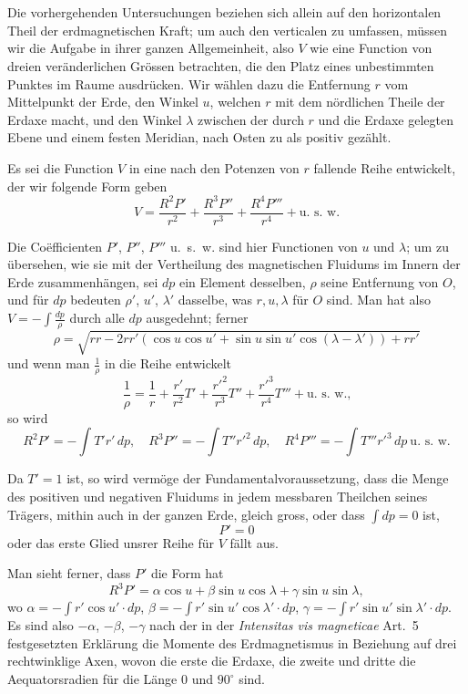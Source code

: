 \documentclass[fontsize=11pt,paper=a4,twoside,openany]{scrbook}
\begin{document}
\section{}

Die vorhergehenden Untersuchungen beziehen sich allein auf den horizontalen Theil der erdmagnetischen Kraft; um auch den verticalen zu umfassen, müssen wir die Aufgabe in ihrer ganzen Allgemeinheit, also $V$ wie eine Function von dreien veränderlichen Grössen betrachten, die den Platz eines unbestimmten Punktes im Raume ausdrücken. Wir wählen dazu die Entfernung $r$ vom Mittelpunkt der Erde, den Winkel $u$, welchen $r$ mit dem nördlichen Theile der Erdaxe macht, und den Winkel $\lambda$ zwischen der durch $r$ und die Erdaxe gelegten Ebene und einem festen Meridian, nach Osten zu als positiv gezählt.

Es sei die Function $V$ in eine nach den Potenzen von $r$ fallende Reihe entwickelt, der wir folgende Form geben
\[
V = \frac{R^2 P'}{r^2} + \frac{R^3 P''}{r^3} + \frac{R^4 P'''}{r^4} + \text{u.~s.~w.}
\]

Die Coëfficienten $P'$, $P''$, $P'''$ u.~s.~w. sind hier Functionen von $u$ und $\lambda$; um zu übersehen, wie sie mit der Vertheilung des magnetischen Fluidums im Innern der Erde zusammenhängen, sei $dp$ ein Element desselben, $\rho$ seine Entfernung von $O$, und für $dp$ bedeuten $\rho'$, $u'$, $\lambda'$ dasselbe, was $r,u,\lambda$ für $O$ sind. Man hat also $V=-\int\frac{dp}{\rho}$ durch alle $dp$ ausgedehnt; ferner
\[
\rho = \sqrt{rr - 2rr'(\cos u\cos u' + \sin u\sin u'\cos(\lambda-\lambda')) + rr'}
\]
und wenn man $\frac{1}{\rho}$ in die Reihe entwickelt
\[
\frac{1}{\rho} = \frac{1}{r} + \frac{r'}{r^2}T' + \frac{r'^2}{r^3}T'' + \frac{r'^3}{r^4}T''' + \text{u.~s.~w.,}
\]
so wird
\[
R^2 P' = -\int T'r'\,dp,\quad R^3 P'' = -\int T''r'^2\,dp,\quad R^4 P''' = -\int T'''r'^3\,dp\ \text{u.~s.~w.}
\]

Da $T'=1$ ist, so wird vermöge der Fundamentalvoraussetzung, dass die Menge des positiven und negativen Fluidums in jedem messbaren Theilchen seines Trägers, mithin auch in der ganzen Erde, gleich gross, oder dass $\int dp=0$ ist,
\[
P' = 0
\]
oder das erste Glied unsrer Reihe für $V$ fällt aus.

Man sieht ferner, dass $P'$ die Form hat
\[
R^3 P' = \alpha\cos u + \beta\sin u\cos\lambda + \gamma\sin u\sin\lambda,
\]
wo $\alpha=-\int r'\cos u'\cdot dp$, $\beta=-\int r'\sin u'\cos\lambda'\cdot dp$, $\gamma=-\int r'\sin u'\sin\lambda'\cdot dp$. Es sind also $-\alpha$, $-\beta$, $-\gamma$ nach der in der \textit{Intensitas vis magneticae} Art.~5 festgesetzten Erklärung die Momente des Erdmagnetismus in Beziehung auf drei rechtwinklige Axen, wovon die erste die Erdaxe, die zweite und dritte die Aequatorsradien für die Länge $0$ und $90^{\circ}$ sind.
\end{document}
